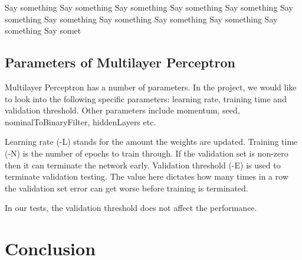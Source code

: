 \documentclass[11pt]{article}
\begin{document}
Say something Say something Say something Say something Say something Say something Say something Say something Say something Say something Say something Say somet

\subsection{Parameters of Multilayer Perceptron}
Multilayer Perceptron has a number of parameters. In the project, we would like to look into the following specific parameters: learning rate, training time and validation threshold. Other parameters include momentum, seed, nominalToBinaryFilter, hiddenLayers etc.

Learning rate (-L) stands for the amount the weights are updated. Training time (-N) is the number of epochs to train through. If the validation set is non-zero then it can terminate the network early. Validation threshold (-E) is used to terminate validation testing. The value here dictates how many times in a row the validation set error can get worse before training is terminated.

In our tests, the validation threshold does not affect the performance.
 
\section{Conclusion}



\newpage


\end{document}
